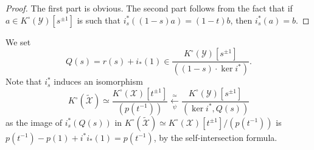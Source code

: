 \documentclass[12pt]{amsart}
\newcommand{\cX}{\mathcal{X}}
\newcommand{\cY}{\mathcal{Y}}
\newcommand{\tcX}{\widetilde{\mathcal{X}}}
\newcommand{\Kring}{K^{\circ}}
\theoremstyle{definition}
\begin{document}
\begin{proof}
    The first part is obvious. The second part follows from the fact that if $a \in \Kring(\cY)[s^{\pm1}]$ is such that $i_s^*((1-s) a)=(1-t)b$, then $i_s^*(a)=b$.
\end{proof}

    We set
    \begin{equation}\label{eq: Q(s)}
        Q(s)=r(s)+i_*(1)\in\frac{\Kring(\cY)[s^{\pm1}]}{((1-s)\cdot\ker i^*)}.
    \end{equation}
    Note that $i_s^*$ induces an isomorphism
    \begin{equation}\label{eq: isom Xtilde Keel formula}
        \Kring(\tcX)\simeq\frac{\Kring(\cX)[t^{\pm1}]}{(p(t^{-1}))}\xleftarrow[\psi]{\simeq}\frac{\Kring(\cY)[s^{\pm1}]}{(\ker i^*,Q(s))}
    \end{equation}
    as the image of $i_s^*(Q(s))$ in $\Kring(\tcX)\simeq\Kring(\cX)[t^{\pm1}]/(p(t^{-1}))$ is $p(t^{-1})-p(1)+i^*i_*(1)=p(t^{-1})$, by the self-intersection formula.
    
\end{document}
